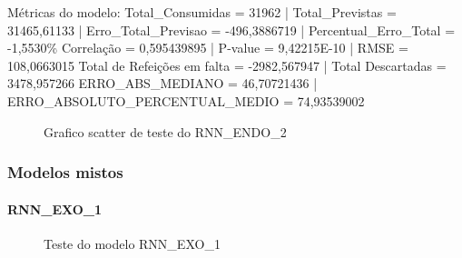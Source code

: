 \documentclass[	12pt, Times, openright, twoside, a4paper, english, brazil]{abntex2}
\begin{document}
            Métricas do modelo:\newline
            Total\_Consumidas = 31962 | Total\_Previstas = 31465,61133 | Erro\_Total\_Previsao = -496,3886719 | Percentual\_Erro\_Total = -1,5530\%\newline
            Correlação = 0,595439895 | P-value = 9,42215E-10         | RMSE = 108,0663015\newline
            Total de Refeições em falta = -2982,567947 | Total Descartadas = 3478,957266\newline
            ERRO\_ABS\_MEDIANO = 46,70721436 | ERRO\_ABSOLUTO\_PERCENTUAL\_MEDIO = 74,93539002\newline
            \begin{figure}[!ht]
              \caption{Grafico scatter de teste do RNN\_ENDO\_2 \label{fig:case1_rnn_endo2_test_scatter} }
            \end{figure}
    	    \subsubsection{Modelos mistos}
              \paragraph{RNN\_EXO\_1}
                \begin{figure}[!ht]
                  \caption{Teste do modelo RNN\_EXO\_1 \label{fig:case1_rnn_exo_1_test} }
                \end{figure}
\end{document}
